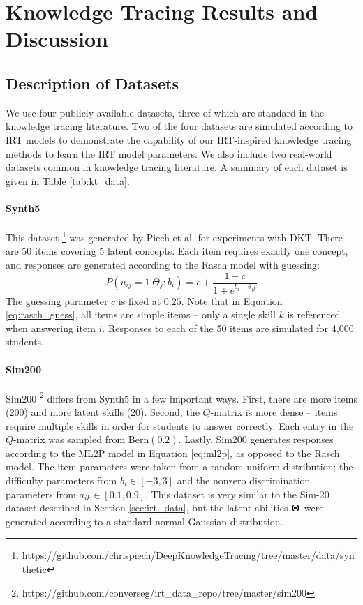 \chapter{Knowledge Tracing Results and Discussion}

\section{Description of Datasets}\label{sec:kt_data}
We use four publicly available datasets, three of which are standard in the knowledge tracing literature. Two of the four datasets are simulated according to IRT models to demonstrate the capability of our IRT-inspired knowledge tracing methods to learn the IRT model parameters. We also include two real-world datasets common in knowledge tracing literature. A summary of each dataset is given in Table \ref{tab:kt_data}.

\subsubsection*{Synth5}
This dataset \footnote{https://github.com/chrispiech/DeepKnowledgeTracing/tree/master/data/synthetic} was generated by Piech et al. \cite{piech2015} for experiments with DKT. There are 50 items covering 5 latent concepts. Each item requires exactly one concept, and responses are generated according to the Rasch model \cite{lord1968} with guessing: 
\begin{equation}
  P(u_{ij} = 1| \Theta_j; b_i) = c + \frac{1-c}{1 + e^{b_i - \theta_{jk}}}
  \label{eq:rasch_guess}
\end{equation}
The guessing parameter $c$ is fixed at $0.25$. Note that in Equation \ref{eq:rasch_guess}, all items are simple items -- only a single skill $k$ is referenced when answering item $i$. Responses to each of the 50 items are simulated for 4,000 students.

\subsubsection*{Sim200}
Sim200 \footnote{https://github.com/converseg/irt\_data\_repo/tree/master/sim200} differs from Synth5 in a few important ways. First, there are more items (200) and more latent skills (20). Second, the $Q$-matrix is more dense -- items require multiple skills in order for students to answer correctly. Each entry in the $Q$-matrix was sampled from $\text{Bern}(0.2)$. Lastly, Sim200 generates responses according to the ML2P model in Equation \ref{eq:ml2p}, as opposed to the Rasch model. The item parameters were taken from a random uniform distribution; the difficulty parameters from $b_i \in [-3,3]$ and the nonzero discrimination parameters from $a_{ik} \in [0.1,0.9]$. This dataset is very similar to the Sim-20 dataset described in Section \ref{sec:irt_data}, but the latent abilities $\boldsymbol{\Theta}$ were generated according to a standard normal Gaussian distribution.

